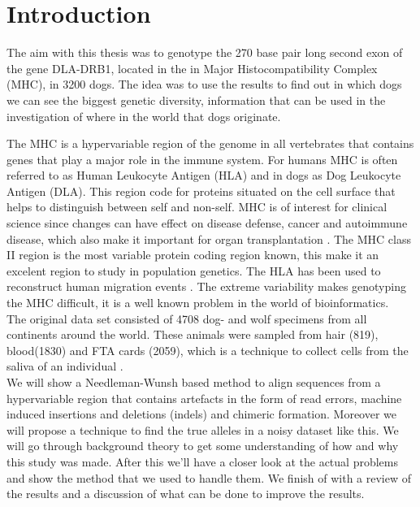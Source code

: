 \section{Introduction}

The aim with this thesis was to genotype the 270 base pair long second exon of the gene DLA-DRB1, located in the in {M}ajor {H}istocompatibility {C}omplex ({MHC}), in 3200 dogs. The idea was to use the results to find out in which dogs we can see the biggest genetic diversity, information that can be used in the investigation of where in the world that dogs originate.

The {MHC} is a hypervariable region of the genome in all vertebrates that contains genes that play a major role in the immune system. For humans MHC is often referred to as Human Leukocyte Antigen (HLA) and in dogs as Dog Leukocyte Antigen (DLA). This region code for proteins situated on the cell surface that helps to distinguish between self and non-self. {MHC} is of interest for clinical science since changes can have effect on disease defense, cancer and autoimmune disease, which also make it important for organ transplantation \cite{hla_typing}. The MHC class II region is the most variable protein coding region known, this make it an excelent region to study in population genetics. The HLA has been used to reconstruct human migration events \cite{abdennaji06,di11,buhler06}. The extreme variability makes genotyping the MHC difficult, it is a well known problem in the world of bioinformatics.\\
The original data set consisted of 4708 dog- and wolf specimens from all continents around the world. These animals were sampled from hair (819), blood(1830) and FTA cards (2059), which is a technique to collect cells from the saliva of an individual \cite{neiman11}.\\
We will show a Needleman-Wunsh\cite{nw} based method to align sequences from a hypervariable region that contains artefacts in the form of read errors, machine induced insertions and deletions (indels) and chimeric formation. Moreover we will propose a technique to find the true alleles in a noisy dataset like this. 
We will go through background theory to get some understanding of how and why this study was made. After this we'll have a closer look at the actual problems and show the method that we used to handle them. We finish of with a review of the results and a discussion of what can be done to improve the results.\\

